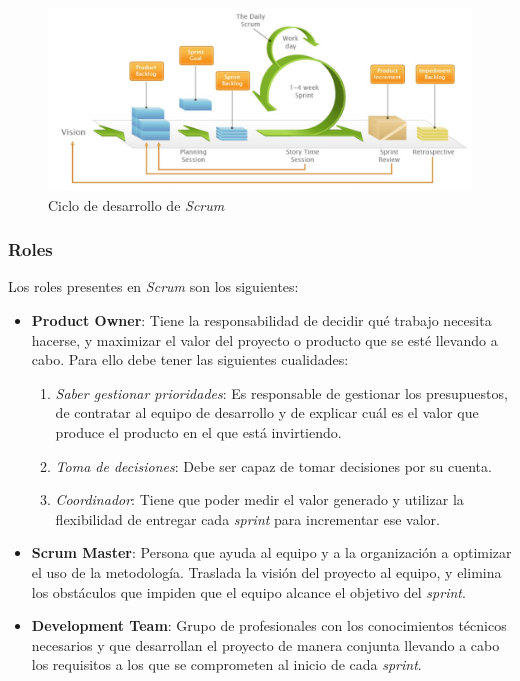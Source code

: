 \begin{figure}[H]
    \centering
    \includegraphics[width=14cm]{Images/Ciclo_Scrum.jpg}
    \caption{Ciclo de desarrollo de \textit{Scrum} \autocite*{TrigasGallego2012}}
\end{figure}

\subsubsection{Roles}
Los roles presentes en \textit{Scrum} son los siguientes:
\begin{itemize}
    \item \textbf{Product Owner}: Tiene la responsabilidad de decidir qué trabajo necesita hacerse, y maximizar el valor 
    del proyecto o producto que se esté llevando a cabo. Para ello debe tener las siguientes cualidades:
    \begin{enumerate}
        \item \textit{Saber gestionar prioridades}: Es responsable de gestionar los presupuestos, de contratar al equipo de 
        desarrollo y de explicar cuál es el valor que produce el producto en el que está invirtiendo.
        \item \textit{Toma de decisiones}: Debe ser capaz de tomar decisiones por su cuenta.
        \item \textit{Coordinador}: Tiene que poder medir el valor generado y utilizar la flexibilidad de entregar cada 
        \textit{sprint} para incrementar ese valor.
    \end{enumerate}
    
    \item \textbf{Scrum Master}: Persona que ayuda al equipo y a la organización a optimizar el uso de la 
    metodología. Traslada la visión del proyecto al equipo, y elimina los obstáculos que impiden que el equipo alcance el 
    objetivo del \textit{sprint}.

    \item \textbf{Development Team}: Grupo de profesionales con los conocimientos técnicos necesarios y que desarrollan el proyecto de manera
    conjunta llevando a cabo los requisitos a los que se comprometen al inicio de cada \textit{sprint}.
\end{itemize}

